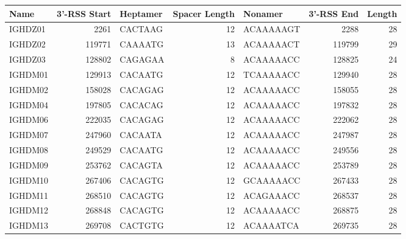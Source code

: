 \begin{tabular}{lrlrlrr}
  \toprule Name & 3'-RSS Start & Heptamer & Spacer Length & Nonamer & 3'-RSS End & Length \\ 
  \midrule IGHDZ01 & 2261 & CACTAAG & 12 & ACAAAAAGT & 2288 & 28 \\ 
  IGHDZ02 & 119771 & CAAAATG & 13 & ACAAAAACT & 119799 & 29 \\ 
  IGHDZ03 & 128802 & CAGAGAA & 8 & ACAAAAACC & 128825 & 24 \\ 
  IGHDM01 & 129913 & CACAATG & 12 & TCAAAAACC & 129940 & 28 \\ 
  IGHDM02 & 158028 & CACAGAG & 12 & ACAAAAACC & 158055 & 28 \\ 
  IGHDM04 & 197805 & CACACAG & 12 & ACAAAAACC & 197832 & 28 \\ 
  IGHDM06 & 222035 & CACAGAG & 12 & ACAAAAACC & 222062 & 28 \\ 
  IGHDM07 & 247960 & CACAATA & 12 & ACAAAAACC & 247987 & 28 \\ 
  IGHDM08 & 249529 & CACAATG & 12 & ACAAAAACC & 249556 & 28 \\ 
  IGHDM09 & 253762 & CACAGTA & 12 & ACAAAAACC & 253789 & 28 \\ 
  IGHDM10 & 267406 & CACAGTG & 12 & GCAAAAACC & 267433 & 28 \\ 
  IGHDM11 & 268510 & CACAGTG & 12 & ACAGAAACC & 268537 & 28 \\ 
  IGHDM12 & 268848 & CACAGTG & 12 & ACAAAAACC & 268875 & 28 \\ 
  IGHDM13 & 269708 & CACTGTG & 12 & ACAAAATCA & 269735 & 28 \\ 
   \bottomrule \end{tabular}
